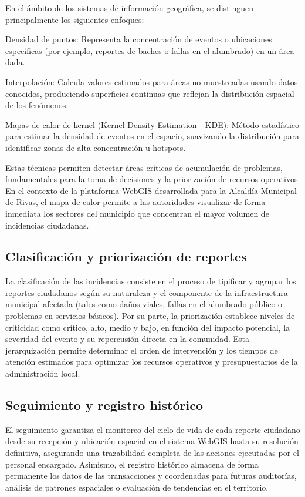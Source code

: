 En el ámbito de los sistemas de información geográfica, se distinguen principalmente los siguientes enfoques: 

Densidad de puntos: Representa la concentración de eventos o ubicaciones específicas (por ejemplo, reportes de baches o fallas en el alumbrado) en un área dada. 

Interpolación: Calcula valores estimados para áreas no muestreadas usando datos conocidos, produciendo superficies continuas que reflejan la distribución espacial de los fenómenos. 

Mapas de calor de kernel (Kernel Density Estimation - KDE): Método estadístico para estimar la densidad de eventos en el espacio, suavizando la distribución para identificar zonas de alta concentración u hotspots. 

Estas técnicas permiten detectar áreas críticas de acumulación de problemas, fundamentales para la toma de decisiones y la priorización de recursos operativos.\cite{bernalanalisis} En el contexto de la plataforma WebGIS desarrollada para la Alcaldía Municipal de Rivas, el mapa de calor permite a las autoridades visualizar de forma inmediata los sectores del municipio que concentran el mayor volumen de incidencias ciudadanas.

\subsection{Clasificación y priorización de reportes}
La clasificación de las incidencias consiste en el proceso de tipificar y agrupar los reportes ciudadanos según su naturaleza y el componente de la infraestructura municipal afectada (tales como daños viales, fallas en el alumbrado público o problemas en servicios básicos). Por su parte, la priorización establece niveles de criticidad como crítico, alto, medio y bajo, en función del impacto potencial, la severidad del evento y su repercusión directa en la comunidad. Esta jerarquización permite determinar el orden de intervención y los tiempos de atención estimados para optimizar los recursos operativos y presupuestarios de la administración local. \cite{parraestrategia}

\subsection{Seguimiento y registro histórico }
El seguimiento garantiza el monitoreo del ciclo de vida de cada reporte ciudadano desde su recepción y ubicación espacial en el sistema WebGIS hasta su resolución definitiva, asegurando una trazabilidad completa de las acciones ejecutadas por el personal encargado. Asimismo, el registro histórico almacena de forma permanente los datos de las transacciones y coordenadas para futuras auditorías, análisis de patrones espaciales o evaluación de tendencias en el territorio. \cite{parraestrategia}

